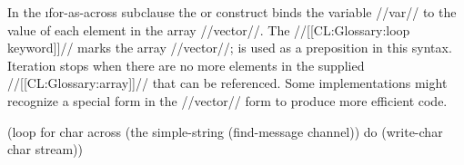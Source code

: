 \endsubsubsubsection%


  In the \i{for-as-across} subclause the  
  or  construct binds the variable //var// to the value of
  each element in the array //vector//.
  The //[[CL:Glossary:loop keyword]]//  marks the array //vector//; 
  is used as a preposition in this syntax.
  Iteration stops when there are no more elements in the supplied
  //[[CL:Glossary:array]]// that can be referenced.
  Some implementations might recognize a  special form
  in the //vector// form to produce more efficient code.

\code
 (loop for char across (the simple-string (find-message channel))
       do (write-char char stream)) \endcode
  \endsubsubsubsubsection%

\endsubsubsubsection%



